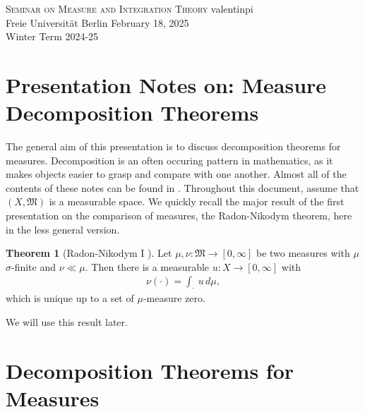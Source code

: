 \documentclass[10pt, leqno]{amsart}
\theoremstyle{definition}
\newtheorem{theorem}{Theorem}[section]
\theoremstyle{remark}
\begin{document}
    \begin{mdframed}
        \textsc{Seminar on Measure and Integration Theory} \hfill valentinpi\\
        Freie Universität Berlin \hfill February 18, 2025\\
        Winter Term 2024-25
    \end{mdframed}

    \section*{Presentation Notes on: Measure Decomposition Theorems}

    The general aim of this presentation is to discuss decomposition theorems for measures. Decomposition is an often occuring pattern in mathematics, as it makes objects easier to grasp and compare with one another. Almost all of the contents of these notes can be found in \cite[pp. 71-76, pp. 113-118]{Fonseca}. Throughout this document, assume that \((X, \mathfrak{M})\) is a measurable space. We quickly recall the major result of the first presentation on the comparison of measures, the Radon-Nikodym theorem, here in the less general version.

    \begin{theorem}[{Radon-Nikodym I \cite[pp. 56-59]{Fonseca}}] \label{thm:radon_nikodym_i}
        Let \(\mu, \nu\colon \mathfrak{M} \to [0, \infty]\) be two measures with \(\mu\) \(\sigma\)-finite and \(\nu \ll \mu\). Then there is a measurable \(u\colon X \to [0, \infty]\) with
        \begin{align}
            \nu(\cdot) = \int_\cdot \, u \, d\mu,
        \end{align}
        which is unique up to a set of \(\mu\)-measure zero.
    \end{theorem}

    We will use this result later.

    \section{Decomposition Theorems for Measures}
\end{document}
